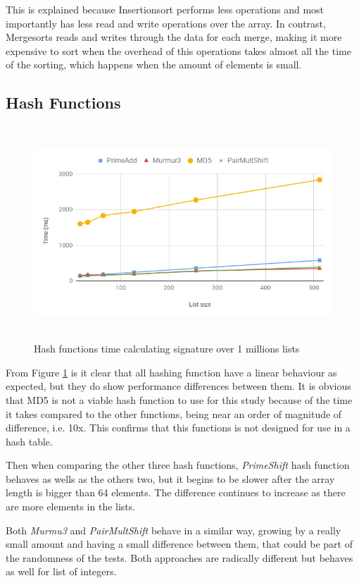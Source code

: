 \documentclass[a4paper,12pt]{article}
\begin{document}
This is explained because Insertionsort performs less operations and most importantly has less read and write operations over the array. In contrast, Mergesorts reads and writes through the data for each merge, making it more expensive to sort when the overhead of this operations takes almost all the time of the sorting, which happens when the amount of elements is small.

\subsection{Hash Functions}

\begin{figure}[H]
    \centering
    \includegraphics[height=8cm,keepaspectratio]{./images/hashes.png}
    \caption{Hash functions time calculating signature over 1 millions lists}
    \label{fig:HashesFunc}
\end{figure}

From Figure \ref{fig:HashesFunc} is it clear that all hashing function have a linear behaviour as expected, but they do show performance differences between them. It is obvious that MD5 is not a viable hash function to use for this study because of the time it takes compared to the other functions, being near an order of magnitude of difference, i.e. 10x. This confirms that this functions is not designed for use in a hash table.

Then when comparing the other three hash functions, {\it PrimeShift} hash function behaves as wells as the others two, but it begins to be slower after the array length is bigger than 64 elements. The difference continues to increase as there are more elements in the lists.

Both {\it Murmu3} and {\it PairMultShift} behave in a similar way, growing by a really small amount and having a small difference between them, that could be part of the randomness of the tests. Both approaches are radically different but behaves as well for list of integers.
\end{document}
